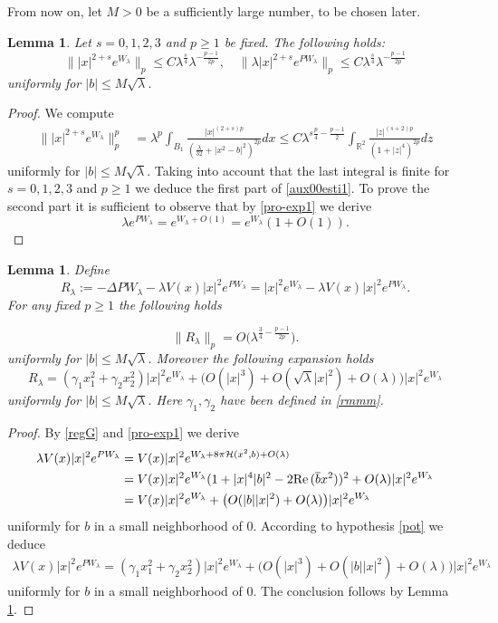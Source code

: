 \documentclass[reqno,11pt]{amsart}
\newtheorem{lemma}[thm]{Lemma}
\theoremstyle{definition}
\numberwithin{equation}{section}
\newcommand{\cal}{\mathcal }
\newcommand{\intr}{\int_{\R^2}}
\newcommand{\R}{\mathbb{R}}
\newcommand{\la}{\lambda}
\newcommand{\into}{\int_{B_1}}
\renewcommand{\(}{\left(}
\renewcommand{\)}{\right)}
\renewcommand{\[}{\left[}
\renewcommand{\]}{\right]}
\newcommand{\beq}{\begin{equation}}
\newcommand{\eeq}{\end{equation}}
\def\Re{{\rm Re}\,}
\begin{document}
{From now on, let 
$M>0$ be a sufficiently large number, to be chosen later.

\begin{lemma}\label{aux00}   Let
 $s=0,1,2,3$ and $p\geq 1$ be fixed. The following holds:\beq\label{aux00esti1}
\|  |x|^{2+s}e^{W_{\la}}\|_p
\leq C\la^{\frac{s}{4}}\la^{-\frac{p-1}{2p}} ,\quad \|  \la |x|^{2+s} e^{PW_{\la}}\|_p
\leq C\la^{\frac{s}{4}}\la^{-\frac{p-1}{2p}} \eeq
uniformly for $|b|\leq M\sqrt{\la}$. 
\end{lemma}
\begin{proof}
We compute $$\begin{aligned}\||x|^{2+s} e^{W_{\la}}\|_p^p&=
\la^{p}\into\frac{|x|^{(2+s )p}}{(\frac{\la}{32}+|x^2-b|^2)^{2p}}dx
\leq C\la^{ s \frac{p}{4}-\frac{p-1}{2}} \intr\frac{|z|^{(s +2)p}}{(1+|z|^4)^{2p}}dz
\end{aligned}$$ uniformly for $|b|\leq M\sqrt\la$.
Taking into account that the last integral is finite for   $s=0,1,2,3$ and $p\geq 1$ 
we deduce the first part of  \eqref{aux00esti1}.
To prove the second part it is sufficient to observe that 
by \eqref{pro-exp1} 
we derive
\beq\label{poi}\la e^{PW_{\la}}= e^{W_{\la}+O(1)}
=e^{W_{\la}}(1+O(1)).\eeq
\end{proof}



\begin{lemma}\label{aux}  Define
$${R}_\la:=
-\Delta PW_\la-\la V(x) |x|^{2}e^{PW_\la}= |x|^{2}e^{W_\la}-\la V(x)|x|^{2} e^{PW_\la}.$$
 For any fixed $p\geq 1$ the following holds

$$\|R_\la\|_{p}=O\big(\la^{\frac34-\frac{p-1}{ 2p}}\big).$$ uniformly for $|b|\leq M\sqrt{\la}$.  
Moreover the following expansion holds  \beq\label{cuore}R_\la=(\gamma_1x_1^2+\gamma_2x_2^2)|x|^{2}e^{W_\la}+\big(O(|x|^3)+O(\sqrt\la|x|^2)+O(\la)\big)|x|^{2}e^{W_\la}\eeq uniformly for $|b|\leq M \sqrt{\la}$.  Here $\gamma_1, \gamma_2$ have been defined in \eqref{rmmm}.

\end{lemma}

\begin{proof}
By \eqref{regG} and  \eqref{pro-exp1}  
we derive $$\begin{aligned}\la V(x)|x|^{2} e^{PW_\la} &
=V(x)|x|^{2} e^{W_\la +8\pi {\cal H}(x^2,b)+O(\la )} 
\\ &=V(x)|x|^{2}e^{W_\la}(1+|x|^4|b|^2-2\Re( \overline bx^2))^2+O(\la)|x|^{2}e^{W_\la}
\\ &= V(x)|x|^{2}e^{W_\la}+  \big(O(|b||x|^2)+O(\la)\big)|x|^{2}e^{W_\la}
\end{aligned}$$ uniformly for $b$ in a small neighborhood of $0$. 
According to hypothesis \eqref{pot} we deduce
$$\begin{aligned}\la V(x)|x|^{2} e^{PW_\la}  
=(\gamma_1x_1^2+\gamma_2x_2^2)|x|^{2}e^{W_\la}+\big(O(|x|^3)+O(|b||x|^2)+O(\la)\big)|x|^{2}e^{W_\la}
\end{aligned}$$  uniformly for $b$ in a small neighborhood of $0$. 
The conclusion follows by Lemma \ref{aux00}. 
  



\end{proof}}
\end{document}
